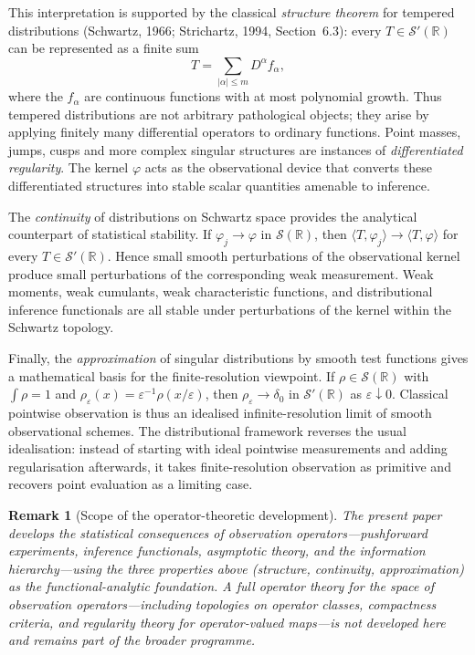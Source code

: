 \documentclass[11pt,a4paper]{article}
\newtheorem{remark}[theorem]{Remark}
\newcommand{\R}{\mathbb{R}}
\begin{document}
This interpretation is supported by the classical \emph{structure theorem}
for tempered distributions (Schwartz, 1966; Strichartz, 1994, Section~6.3):
every $T \in \mathcal S'(\R)$ can be represented as a finite sum
\[
T = \sum_{|\alpha| \leq m} D^\alpha f_\alpha,
\]
where the $f_\alpha$ are continuous functions with at most polynomial
growth.  Thus tempered distributions are not arbitrary pathological objects;
they arise by applying finitely many differential operators to ordinary
functions.  Point masses, jumps, cusps and more complex singular structures
are instances of \emph{differentiated regularity}.  The kernel $\varphi$
acts as the observational device that converts these differentiated
structures into stable scalar quantities amenable to inference.

The \emph{continuity} of distributions on Schwartz space provides the
analytical counterpart of statistical stability.  If
$\varphi_j \to \varphi$ in $\mathcal S(\R)$, then
$\langle T, \varphi_j \rangle \to \langle T, \varphi \rangle$ for every
$T \in \mathcal S'(\R)$.  Hence small smooth perturbations of the
observational kernel produce small perturbations of the corresponding weak
measurement.  Weak moments, weak cumulants, weak characteristic functions,
and distributional inference functionals are all stable under perturbations
of the kernel within the Schwartz topology.

Finally, the \emph{approximation} of singular distributions by smooth test
functions gives a mathematical basis for the finite-resolution viewpoint.
If $\rho \in \mathcal S(\R)$ with $\int \rho = 1$ and
$\rho_\varepsilon(x) = \varepsilon^{-1}\rho(x/\varepsilon)$, then
$\rho_\varepsilon \to \delta_0$ in $\mathcal S'(\R)$ as
$\varepsilon \downarrow 0$.  Classical pointwise observation is thus an
idealised infinite-resolution limit of smooth observational schemes.  The
distributional framework reverses the usual idealisation: instead of
starting with ideal pointwise measurements and adding regularisation
afterwards, it takes finite-resolution observation as primitive and
recovers point evaluation as a limiting case.

\begin{remark}[Scope of the operator-theoretic development]\label{rem:operator-scope-full}
The present paper develops the \emph{statistical consequences} of
observation operators---pushforward experiments, inference functionals,
asymptotic theory, and the information hierarchy---using the three
properties above (structure, continuity, approximation) as the
functional-analytic foundation.  A full operator theory for the space of
observation operators---including topologies on operator classes,
compactness criteria, and regularity theory for operator-valued maps---is
not developed here and remains part of the broader programme.
\end{remark}
\end{document}
